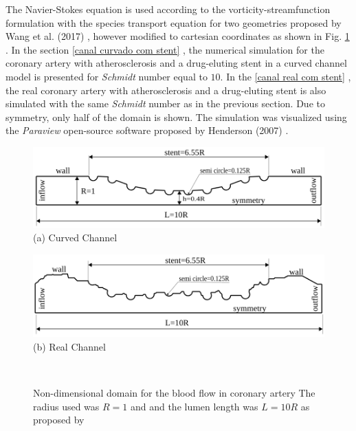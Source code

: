 \documentclass[10pt,fleqn,a4paper,twoside]{article}
\begin{document}
\medskip
The Navier-Stokes equation is used according to the 
vorticity-streamfunction formulation with 
the species transport equation for two geometries proposed 
by Wang et al. (2017) \cite{wang2017}, however modified to 
cartesian coordinates as shown in Fig. \ref{coronary artery geo} . 
In the section \ref{canal curvado com stent} , the numerical 
simulation for the coronary artery with atherosclerosis 
and a drug-eluting stent in a curved channel model 
is presented for 
\textit{Schmidt} number equal to $10$. 
In the \ref{canal real com stent} , the real coronary 
artery with atherosclerosis and a drug-eluting stent is also 
simulated with the same \textit{Schmidt} number 
as in the previous section.
Due to symmetry, only half of the domain is shown. 
The simulation was visualized using the \textit{Paraview} open-source 
software proposed by Henderson (2007) \cite{paraview}.


\begin{figure}[H]
     \begin{center}
     \begin{minipage}{.45\linewidth}
     \begin{center}
      \includegraphics[scale=0.22]{./figure/CurvedStrut.png}\\
     (a) Curved Channel
     \end{center}
     \end{minipage}%
     \begin{minipage}{.45\linewidth}
     \begin{center}
      \includegraphics[scale=0.22]{./figure/RealStrut.png}\\
     (b) Real Channel
     \end{center}
     \end{minipage}\\[3mm]
     \end{center}
     \label{coronary artery geo}
     \caption{Non-dimensional domain for the blood flow in coronary artery
     The radius used was $R=1$ and and the lumen length was $L=10R$ as proposed by \cite{wang2017}}
\end{figure}
\end{document}
